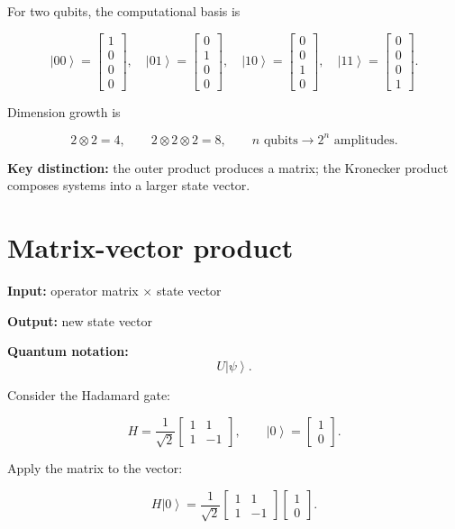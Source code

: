 \documentclass[11pt,a4paper]{article}
\newcommand{\ket}[1]{\left|#1\right\rangle}
\begin{document}
For two qubits, the computational basis is

\[
\ket{00}=
\begin{bmatrix}1\\0\\0\\0\end{bmatrix},
\quad
\ket{01}=
\begin{bmatrix}0\\1\\0\\0\end{bmatrix},
\quad
\ket{10}=
\begin{bmatrix}0\\0\\1\\0\end{bmatrix},
\quad
\ket{11}=
\begin{bmatrix}0\\0\\0\\1\end{bmatrix}.
\]

Dimension growth is

\[
2\otimes2=4,
\qquad
2\otimes2\otimes2=8,
\qquad
n\text{ qubits}\longrightarrow2^n\text{ amplitudes}.
\]

\textbf{Key distinction:} the outer product produces a matrix; the Kronecker
product composes systems into a larger state vector.

\section{Matrix-vector product}

\textbf{Input:} operator matrix $\times$ state vector

\textbf{Output:} new state vector

\textbf{Quantum notation:}
\[
U\ket{\psi}.
\]

Consider the Hadamard gate:

\[
H=
\frac{1}{\sqrt{2}}
\begin{bmatrix}
1 & 1\\
1 & -1
\end{bmatrix},
\qquad
\ket{0}=
\begin{bmatrix}
1\\0
\end{bmatrix}.
\]

Apply the matrix to the vector:

\[
H\ket{0}
=
\frac{1}{\sqrt{2}}
\begin{bmatrix}
1 & 1\\
1 & -1
\end{bmatrix}
\begin{bmatrix}
1\\0
\end{bmatrix}.
\]
\end{document}
